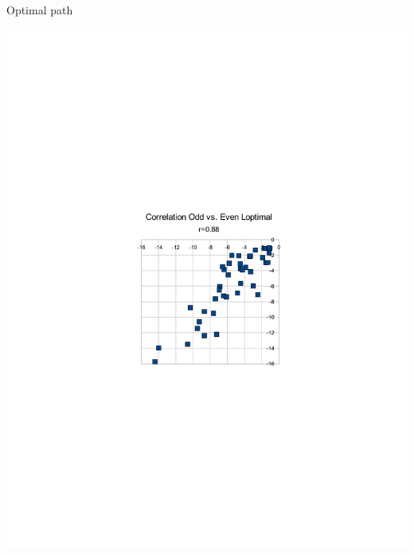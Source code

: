\documentclass[xcolor=table]{beamer}
\begin{document}
\begin{frame}{Optimal path}
\centerline{
 \includegraphics[trim= 10cm 10cm 10cm 10cm,height=.8\textheight]{loptimal.pdf}}
\end{frame}
\end{document}
